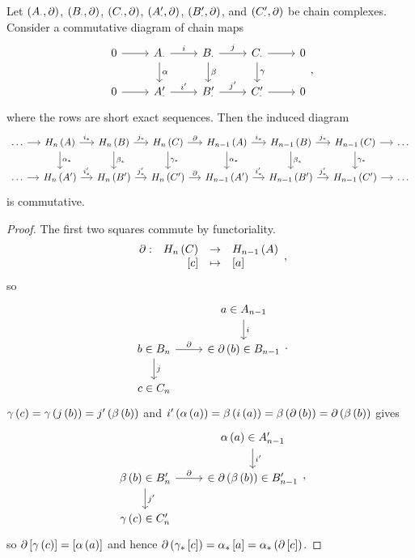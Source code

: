 \begin{proposition}
Let $ \left( A_\cdot, \partial \right) $, $ \left( B_\cdot, \partial \right) $, $ \left( C_\cdot, \partial \right) $, $ \left( A_\cdot', \partial \right) $, $ \left( B_\cdot', \partial \right) $, and $ \left( C_\cdot', \partial \right) $ be chain complexes. Consider a commutative diagram of chain maps
$$
\begin{tikzcd}
0 \arrow{r} & A_\cdot \arrow{r}{i} \arrow{d}{\alpha} & B_\cdot \arrow{r}{j} \arrow{d}{\beta} & C_\cdot \arrow{r} \arrow{d}{\gamma} & 0 \\
0 \arrow{r} & A_\cdot' \arrow{r}{i'} & B_\cdot' \arrow{r}{j'} & C_\cdot' \arrow{r} & 0
\end{tikzcd},
$$
where the rows are short exact sequences. Then the induced diagram
$$
\begin{tikzcd}[column sep=small]
\dots \arrow{r} & H_n\rb{A} \arrow{r}{i_*} \arrow{d}{\alpha_*} & H_n\rb{B} \arrow{r}{j_*} \arrow{d}{\beta_*} & H_n\rb{C} \arrow{r}{\partial} \arrow{d}{\gamma_*} & H_{n - 1}\rb{A} \arrow{r}{i_*} \arrow{d}{\alpha_*} & H_{n - 1}\rb{B} \arrow{r}{j_*} \arrow{d}{\beta_*} & H_{n - 1}\rb{C} \arrow{r} \arrow{d}{\gamma_*} & \dots \\
\dots \arrow{r} & H_n\rb{A'} \arrow{r}{i_*'} & H_n\rb{B'} \arrow{r}{j_*'} & H_n\rb{C'} \arrow{r}{\partial} & H_{n - 1}\rb{A'} \arrow{r}{i_*'} & H_{n - 1}\rb{B'} \arrow{r}{j_*'} & H_{n - 1}\rb{C'} \arrow{r} & \dots
\end{tikzcd}
$$
is commutative.
\end{proposition}

\begin{proof}
The first two squares commute by functoriality.
$$ \function[\partial]{H_n\rb{C}}{H_{n - 1}\rb{A}}{\sb{c}}{\sb{a}}, $$
so
$$
\begin{tikzcd}
& a \in A_{n - 1} \arrow{d}{i} \\
b \in B_n \arrow{r}{\partial} \arrow{d}{j} & \in \partial\rb{b} \in B_{n - 1} \\
c \in C_n &
\end{tikzcd}.
$$
$ \gamma\left( c \right) = \gamma\left( j\left( b \right) \right) = j'\left( \beta\left( b \right) \right) $ and $ i'\left( \alpha\left( a \right) \right) = \beta\left( i\left( a \right) \right) = \beta\left( \partial\left( b \right) \right) = \partial\left( \beta\left( b \right) \right) $ gives
$$
\begin{tikzcd}
& \alpha\rb{a} \in A_{n - 1}' \arrow{d}{i'} \\
\beta\rb{b} \in B_n' \arrow{r}{\partial} \arrow{d}{j'} & \in \partial\rb{\beta\rb{b}} \in B_{n - 1}' \\
\gamma\rb{c} \in C_n' &
\end{tikzcd},
$$
so $ \partial\left[ \gamma\left( c \right) \right] = \left[ \alpha\left( a \right) \right] $ and hence $ \partial\left( \gamma_*\left[ c \right] \right) = \alpha_*\left[ a \right] = \alpha_*\left( \partial\left[ c \right] \right) $.
\end{proof}

